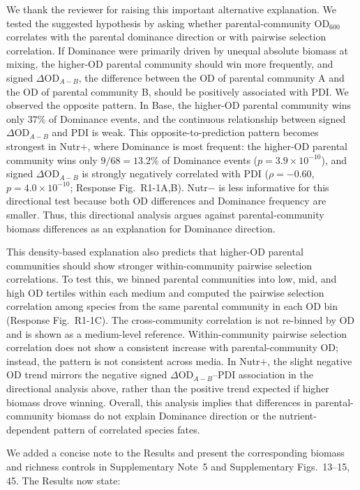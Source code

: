 \responselabel
We thank the reviewer for raising this important alternative explanation. We tested the suggested hypothesis by asking whether parental-community OD$_{600}$ correlates with the parental dominance direction or with pairwise selection correlation.
If Dominance were primarily driven by unequal absolute biomass at mixing, the higher-OD parental community should win more frequently, and signed $\Delta\text{OD}_{A-B}$, the difference between the OD of parental community A and the OD of parental community B, should be positively associated with PDI\@. We observed the opposite pattern. In Base, the higher-OD parental community wins only $37\%$ of Dominance events, and the continuous relationship between signed $\Delta\text{OD}_{A-B}$ and PDI is weak. This opposite-to-prediction pattern becomes strongest in Nutr$+$, where Dominance is most frequent: the higher-OD parental community wins only $9/68 = 13.2\%$ of Dominance events ($p = 3.9 \times 10^{-10}$), and signed $\Delta\text{OD}_{A-B}$ is strongly negatively correlated with PDI ($\rho = -0.60$, $p = 4.0 \times 10^{-10}$; Response Fig.~R1-1A,B). Nutr$-$ is less informative for this directional test because both OD differences and Dominance frequency are smaller. Thus, this directional analysis argues against parental-community biomass differences as an explanation for Dominance direction.

This density-based explanation also predicts that higher-OD parental communities should show stronger within-community pairwise selection correlations. To test this, we binned parental communities into low, mid, and high OD tertiles within each medium and computed the pairwise selection correlation among species from the same parental community in each OD bin (Response Fig.~R1-1C). The cross-community correlation is not re-binned by OD and is shown as a medium-level reference. Within-community pairwise selection correlation does not show a consistent increase with parental-community OD; instead, the pattern is not consistent across media. In Nutr$+$, the slight negative OD trend mirrors the negative signed $\Delta\text{OD}_{A-B}$--PDI association in the directional analysis above, rather than the positive trend expected if higher biomass drove winning. Overall, this analysis implies that differences in parental-community biomass do not explain Dominance direction or the nutrient-dependent pattern of correlated species fates.

We added a concise note to the Results and present the corresponding biomass and richness controls in Supplementary Note~5 and Supplementary Figs.~13--15, 45. The Results now state: 

